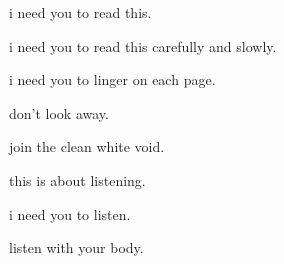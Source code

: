 \documentclass[extrafontsizes, 48pt]{memoir}
\newcommand\blankpage{%
    \null
    \thispagestyle{empty}%
    \addtocounter{page}{-1}%
    \newpage}
\begin{document}
	\begin{minipage}{.6\textwidth}
	i need you to read this.
	\end{minipage}
	\newpage

	\begin{minipage}{.6\textwidth}
	i need you to read this carefully and slowly.
	\afterpage{\blankpage}
	\end{minipage}
	\newpage

	\begin{minipage}{.6\textwidth}
	i need you to linger on each page.
	\end{minipage}
	\newpage

	\begin{minipage}{.6\textwidth}
	don't look away.
	\end{minipage}
	\newpage

	\begin{minipage}{.6\textwidth}
	join the clean white void.
	\afterpage{\blankpage}
	\end{minipage}
	\newpage

	\begin{minipage}{.6\textwidth}
	this is about listening.
	\end{minipage}
	\newpage

	\begin{minipage}{.6\textwidth}
	i need you to listen.
	\afterpage{\blankpage}
	\end{minipage}
	\newpage

	\begin{minipage}{.6\textwidth}
	listen with your body.
	\end{minipage}
	\newpage
\end{document}
